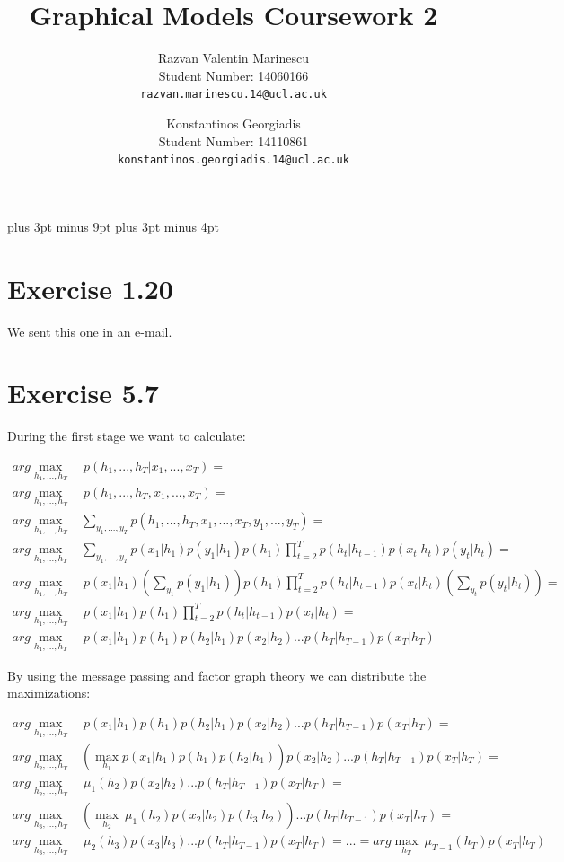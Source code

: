 \documentclass[11pt,a4paper,oneside]{report}
\title{Graphical Models Coursework 2}
\author{
Razvan Valentin Marinescu\\
Student Number: 14060166\\
\texttt{razvan.marinescu.14@ucl.ac.uk}
\and
Konstantinos Georgiadis\\
Student Number: 14110861\\
\texttt{konstantinos.georgiadis.14@ucl.ac.uk}
}
\begin{document}
\belowdisplayskip=12pt plus 3pt minus 9pt
\belowdisplayshortskip=7pt plus 3pt minus 4pt
\maketitle{}

\section*{Exercise 1.20}

	We sent this one in an e-mail.

\section*{Exercise 5.7}

During the first stage we want to calculate:	

\begin{align*}
arg\max_{h_1,...,h_T}&\ p(h_1,...,h_T|x_1,...,x_T)=\\
arg\max_{h_1,...,h_T}&\ p(h_1,...,h_T,x_1,...,x_T)=\\
arg\max_{h_1,...,h_T}&\sum_{y_1,...,y_T}p(h_1,...,h_T,x_1,...,x_T,y_1,...,y_T)=\\		
arg\max_{h_1,...,h_T}&\sum_{y_1,...,y_T}p(x_1|h_1)p(y_1|h_1)p(h_1)\prod_{t=2}^Tp(h_t|h_{t-1})p(x_t|h_t)p(y_t|h_t)=\\	
arg\max_{h_1,...,h_T}&\ p(x_1|h_1)\left(\sum_{y_1}p(y_1|h_1)\right)p(h_1)\prod_{t=2}^Tp(h_t|h_{t-1})p(x_t|h_t)\left(\sum_{y_t}p(y_t|h_t)\right)=\\	
arg\max_{h_1,...,h_T}&\ p(x_1|h_1)p(h_1)\prod_{t=2}^Tp(h_t|h_{t-1})p(x_t|h_t)=\\		
arg\max_{h_1,...,h_T}&\ p(x_1|h_1)p(h_1)p(h_2|h_1)p(x_2|h_2)...p(h_T|h_{T-1})p(x_T|h_T)			
\end{align*}

By using the message passing and factor graph theory we can distribute the maximizations:

\begin{align*}
arg\max_{h_1,...,h_T}&\ p(x_1|h_1)p(h_1)p(h_2|h_1)p(x_2|h_2)...p(h_T|h_{T-1})p(x_T|h_T)=\\	
arg\max_{h_2,...,h_T}&\left(\max_{h_1} p(x_1|h_1)p(h_1)p(h_2|h_1)\right)p(x_2|h_2)...p(h_T|h_{T-1})p(x_T|h_T)=\\
arg\max_{h_2,...,h_T}&\ \mu_1(h_2)p(x_2|h_2)...p(h_T|h_{T-1})p(x_T|h_T)=\\
arg\max_{h_3,...,h_T}&\left(\max_{h_2}\ \mu_1(h_2)p(x_2|h_2)p(h_3|h_2)\right)...p(h_T|h_{T-1})p(x_T|h_T)=\\
arg\max_{h_3,...,h_T}&\ \mu_2(h_3)p(x_3|h_3)...p(h_T|h_{T-1})p(x_T|h_T)=...=arg\max_{h_T}\ \mu_{T-1}(h_T)p(x_T|h_T)
\end{align*}
\end{document}
